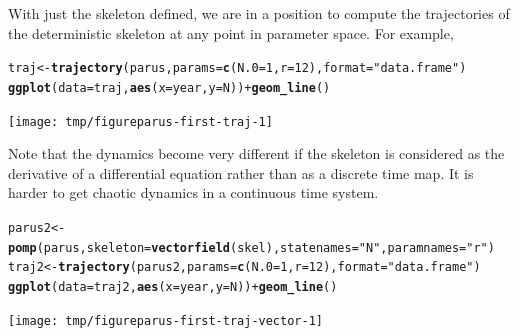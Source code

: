 \documentclass{beamer}\usepackage[]{graphicx}\usepackage[]{color}
\makeatletter
\newcommand{\hlnum}[1]{\textcolor[rgb]{0.686,0.059,0.569}{#1}}%
\newcommand{\hlstr}[1]{\textcolor[rgb]{0.192,0.494,0.8}{#1}}%
\newcommand{\hlopt}[1]{\textcolor[rgb]{0,0,0}{#1}}%
\newcommand{\hlstd}[1]{\textcolor[rgb]{0.345,0.345,0.345}{#1}}%
\newcommand{\hlkwb}[1]{\textcolor[rgb]{0.69,0.353,0.396}{#1}}%
\newcommand{\hlkwc}[1]{\textcolor[rgb]{0.333,0.667,0.333}{#1}}%
\newcommand{\hlkwd}[1]{\textcolor[rgb]{0.737,0.353,0.396}{\textbf{#1}}}%
\newenvironment{kframe}{%
 \def\at@end@of@kframe{}%
 \ifinner\ifhmode%
  \def\at@end@of@kframe{\end{minipage}}%
  \begin{minipage}{\columnwidth}%
 \fi\fi%
 \def\FrameCommand##1{\hskip\@totalleftmargin \hskip-\fboxsep
 \colorbox{shadecolor}{##1}\hskip-\fboxsep
     \hskip-\linewidth \hskip-\@totalleftmargin \hskip\columnwidth}%
 \MakeFramed {\advance\hsize-\width
   \@totalleftmargin\z@ \linewidth\hsize
   \@setminipage}}%
 {\par\unskip\endMakeFramed%
 \at@end@of@kframe}
\newenvironment{knitrout}{}{} %
\makeatother
\begin{document}
\begin{frame}[fragile]

With just the skeleton defined, we are in a position to compute the trajectories of the deterministic skeleton at any point in parameter space.
For example,

\begin{knitrout}\small
{}\color{fgcolor}\begin{kframe}
\begin{alltt}
\hlstd{traj} \hlkwb{<-} \hlkwd{trajectory}\hlstd{(parus,}\hlkwc{params}\hlstd{=}\hlkwd{c}\hlstd{(}\hlkwc{N.0}\hlstd{=}\hlnum{1}\hlstd{,}\hlkwc{r}\hlstd{=}\hlnum{12}\hlstd{),} \hlkwc{format}\hlstd{=}\hlstr{"data.frame"}\hlstd{)}
\hlkwd{ggplot}\hlstd{(}\hlkwc{data}\hlstd{=traj,}\hlkwd{aes}\hlstd{(}\hlkwc{x}\hlstd{=year,}\hlkwc{y}\hlstd{=N))}\hlopt{+}\hlkwd{geom_line}\hlstd{()}
\end{alltt}
\end{kframe}

{\centering \texttt{[image: tmp/figureparus-first-traj-1]} 

}



\end{knitrout}

\end{frame}

\begin{frame}[fragile]
\bi
\item
Note that the dynamics become very different if the skeleton is considered as the derivative of a differential equation rather than as a discrete time map. It is harder to get chaotic dynamics in a continuous time system. 
\ei

\begin{knitrout}\small
{}\color{fgcolor}\begin{kframe}
\begin{alltt}
\hlstd{parus2} \hlkwb{<-} \hlkwd{pomp}\hlstd{(parus,}\hlkwc{skeleton}\hlstd{=}\hlkwd{vectorfield}\hlstd{(skel),}\hlkwc{statenames}\hlstd{=}\hlstr{"N"}\hlstd{,}\hlkwc{paramnames}\hlstd{=}\hlstr{"r"}\hlstd{)}
\hlstd{traj2} \hlkwb{<-} \hlkwd{trajectory}\hlstd{(parus2,}\hlkwc{params}\hlstd{=}\hlkwd{c}\hlstd{(}\hlkwc{N.0}\hlstd{=}\hlnum{1}\hlstd{,}\hlkwc{r}\hlstd{=}\hlnum{12}\hlstd{),}\hlkwc{format}\hlstd{=}\hlstr{"data.frame"}\hlstd{)}
\hlkwd{ggplot}\hlstd{(}\hlkwc{data}\hlstd{=traj2,}\hlkwd{aes}\hlstd{(}\hlkwc{x}\hlstd{=year,}\hlkwc{y}\hlstd{=N))}\hlopt{+}\hlkwd{geom_line}\hlstd{()}
\end{alltt}
\end{kframe}

{\centering \texttt{[image: tmp/figureparus-first-traj-vector-1]} 

}



\end{knitrout}

\end{frame}   
\end{document}
